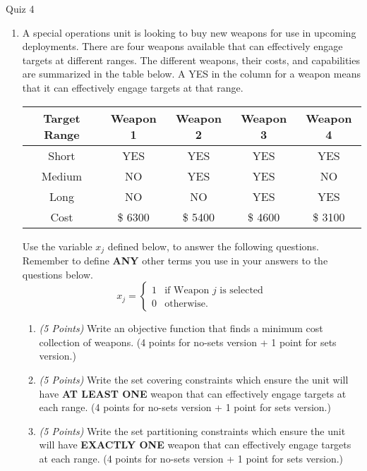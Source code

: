\documentclass[10pt]{article}
\newcommand{\binvar}[1]{\left\{
    \begin{array}{ll}
      1 & \mbox{#1} \\
      0 & \mbox{otherwise.}
    \end{array}
    \right.}
\begin{document}
\begin{center}
  {\sc Quiz 4}\\
\end{center}

\newcommand{\points}[1]{{\it (#1 Points)}}

\begin{enumerate}
\item  A special operations unit is looking to buy new weapons for use in upcoming deployments.  There are four weapons available that can effectively engage targets at different ranges.  The different weapons, their costs, and capabilities are summarized in the table below.  A YES in the column for a weapon means that it can effectively engage targets at that range.

  \begin{center}
    \begin{tabular}{c||c|c|c|c}
      Target Range & Weapon 1 & Weapon 2 & Weapon 3 & Weapon 4 \\
      \hline
      \hline
      Short & YES & YES & YES & YES \\
      \hline
      Medium & NO & YES & YES & NO \\
      \hline
      Long & NO & NO & YES & YES \\
      \hline
      \hline
      Cost & \$ 6300 & \$ 5400 & \$ 4600 & \$ 3100 \\
     \hline
    \end{tabular}
  \end{center}

Use the variable $x_j$ defined below, to answer the following questions.  Remember to define {\bf ANY} other terms you use in your answers to the questions below.
  \[
  x_{j} = \binvar{if Weapon $j$ is selected}
  \]


\begin{enumerate}
\item \points{5} Write an objective function that finds a minimum cost collection of weapons.  (4 points for no-sets version + 1 point for sets version.)

\newpage


\item \points{5} Write the set covering constraints which ensure the unit will have {\bf AT LEAST ONE} weapon that can effectively engage targets at each range.  (4 points for no-sets version + 1 point for sets version.)

\vfill

\item \points{5} Write the set partitioning constraints which ensure the unit will have {\bf EXACTLY ONE} weapon that can effectively engage targets at each range.  (4 points for no-sets version + 1 point for sets version.)

\vfill

\end{enumerate}



\end{enumerate}
\end{document}
